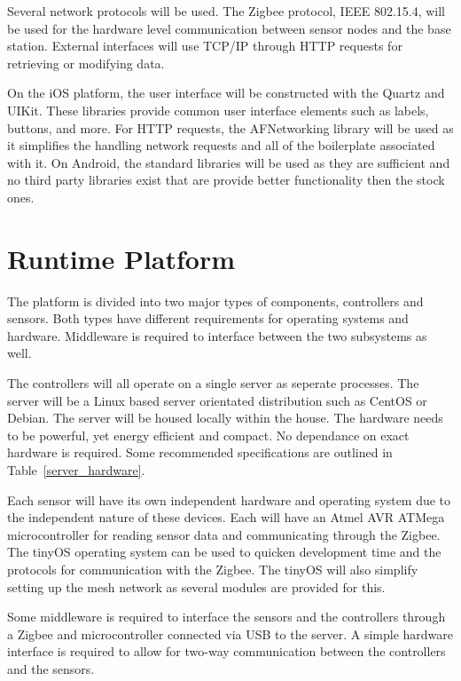 \documentclass{report}
\begin{document}
Several network protocols will be used. The Zigbee protocol, IEEE
802.15.4, will be used for the hardware level communication between
sensor nodes and the base station. External interfaces will use TCP/IP
through HTTP requests for retrieving or modifying data.

On the iOS platform, the user interface will be constructed with the Quartz and
UIKit. These libraries provide common user interface elements such as labels,
buttons, and more. For HTTP requests, the AFNetworking library will be used as
it simplifies the handling network requests and all of the boilerplate
associated with it. On Android, the standard libraries will be used as they are
sufficient and no third party libraries exist that are provide better
functionality then the stock ones.



\section{Runtime Platform}
The platform is divided into two major types of components, controllers and
sensors. Both types have different requirements for operating systems and
hardware. Middleware is required to interface between the two subsystems as well. 

The controllers will all operate on a single server as seperate processes. The
server will be a Linux based server orientated distribution such as CentOS or
Debian. The server will be housed locally within the house. The hardware needs
to be powerful, yet energy efficient and compact. No dependance on exact
hardware is required. Some recommended specifications are outlined in
Table~\ref{server_hardware}.

Each sensor will have its own independent hardware and operating system due to
the independent nature of these devices. Each will have an Atmel AVR ATMega
microcontroller for reading sensor data and communicating through the Zigbee.
The tinyOS operating system can be used to quicken development time and the
protocols for communication with the Zigbee. The tinyOS will also simplify
setting up the mesh network as several modules are provided for this.

Some middleware is required to interface the sensors and the controllers
through a Zigbee and microcontroller connected via USB to the server. A simple
hardware interface is required to allow for two-way communication between the
controllers and the sensors.
\end{document}
